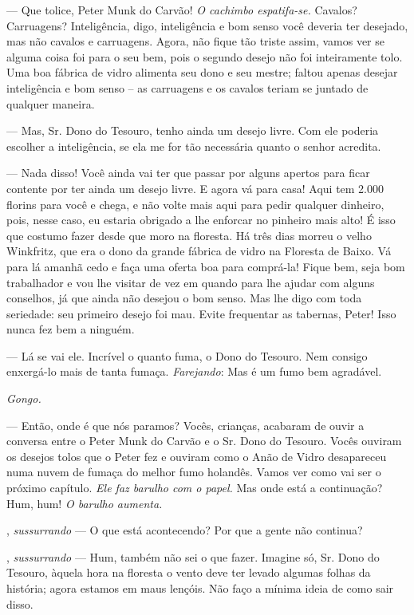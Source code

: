 \begin{myparindent}{0pt}
\begin{Parskip}
 --- Que tolice, Peter Munk do Carvão! \emph{O cachimbo
espatifa-se.} Cavalos? Carruagens? Inteligência, digo, inteligência e
bom senso você deveria ter desejado, mas não cavalos e carruagens.
Agora, não fique tão triste assim, vamos ver se alguma coisa foi para o
seu bem, pois o segundo desejo não foi inteiramente tolo. Uma boa
fábrica de vidro alimenta seu dono e seu mestre; faltou apenas desejar
inteligência e bom senso -- as carruagens e os cavalos teriam se juntado
de qualquer maneira.

 --- Mas, Sr. Dono do Tesouro, tenho ainda um desejo
livre. Com ele poderia escolher a inteligência, se ela me for tão
necessária quanto o senhor acredita.

 --- Nada disso! Você ainda vai ter que passar por alguns
apertos para ficar contente por ter ainda um desejo livre. E agora vá
para casa! Aqui tem 2.000 florins para você e chega, e não volte mais
aqui para pedir qualquer dinheiro, pois, nesse caso, eu estaria obrigado
a lhe enforcar no pinheiro mais alto! É isso que costumo fazer desde que
moro na floresta. Há três dias morreu o velho Winkfritz, que era o dono
da grande fábrica de vidro na Floresta de Baixo. Vá para lá amanhã cedo
e faça uma oferta boa para comprá-la! Fique bem, seja bom trabalhador e
vou lhe visitar de vez em quando para lhe ajudar com alguns conselhos,
já que ainda não desejou o bom senso. Mas lhe digo com toda seriedade:
seu primeiro desejo foi mau. Evite frequentar as tabernas, Peter! Isso
nunca fez bem a ninguém.

 --- Lá se vai ele. Incrível o quanto fuma, o Dono do
Tesouro. Nem consigo enxergá-lo mais de tanta fumaça. \emph{Farejando}:
Mas é um fumo bem agradável.

\emph{Gongo.}

 --- Então, onde é que nós paramos? Vocês, crianças, acabaram de
ouvir a conversa entre o Peter Munk do Carvão e o Sr. Dono do Tesouro.
Vocês ouviram os desejos tolos que o Peter fez e ouviram como o Anão de
Vidro desapareceu numa nuvem de fumaça do melhor fumo holandês. Vamos
ver como vai ser o próximo capítulo. \emph{Ele faz barulho com o papel.}
Mas onde está a continuação? Hum, hum! \emph{O barulho aumenta.}

, \emph{sussurrando} --- O que está acontecendo? Por que a
gente não continua?

, \emph{sussurrando} --- Hum, também não sei o que fazer. Imagine
só, Sr. Dono do Tesouro, àquela hora na floresta o vento deve ter levado
algumas folhas da história; agora estamos em maus lençóis. Não faço a
mínima ideia de como sair disso.


\end{Parskip}
\end{myparindent}
